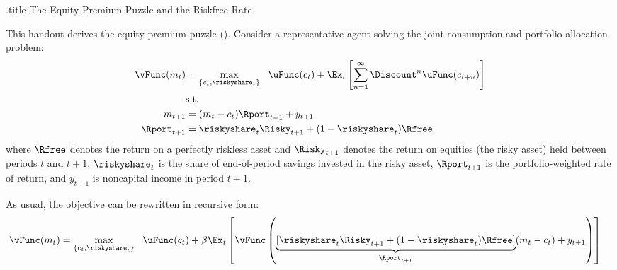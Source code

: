\documentclass{handout}
\begin{document}
\handoutHeader

\begin{verbatimwrite}{\jobname.title}
The Equity Premium Puzzle and the Riskfree Rate
\end{verbatimwrite}

\handoutNameMake


This handout derives the equity premium puzzle
(\cite{mehraPrescottPuzzle}).  Consider a representative agent
solving the joint consumption and portfolio allocation problem:
\begin{equation}\begin{gathered}\begin{aligned}
        \vFunc(m_{t}) & =  \max_{\{c_{t},\riskyshare_{t}\}} ~~\uFunc(c_{t}) + \Ex_{t}\left[\sum_{n=1}^{\infty} \Discount^{n} \uFunc(c_{t+n}) \right]
\\  & \text{s.t.}   \nonumber
\\      m_{t+1} & =  (m_{t}-c_{t})\Rport_{t+1} + y_{t+1}  
\\      \Rport_{t+1} & =  \riskyshare_{t}\Risky_{t+1}+(1-\riskyshare_{t})\Rfree
\end{aligned}\end{gathered}\end{equation}
where $\Rfree$ denotes the return on a perfectly riskless asset and 
$\Risky_{t+1}$ denotes the return on equities (the risky asset) held 
between periods $t$ and $t+1$, $\riskyshare_{t}$ is the share of end-of-period
savings invested in the risky asset, $\Rport_{t+1}$ is the portfolio-weighted 
rate of return, and $y_{t+1}$ is noncapital income in period $t+1$.

As usual, the objective can be rewritten in recursive form:
\begin{equation}\begin{gathered}\begin{aligned}
        \vFunc(m_{t}) & =  \max_{\{c_{t},\riskyshare_{t}\}} ~~\uFunc(c_{t}) +\beta \Ex_{t}\left[\vFunc\left(\underbrace{[\riskyshare_{t}\Risky_{t+1}+(1-\riskyshare_{t})\Rfree]}_{{\Rport}_{t+1}}(m_{t}-c_{t})+{y}_{t+1}\right)\right]
\end{aligned}\end{gathered}\end{equation}
\end{document}
